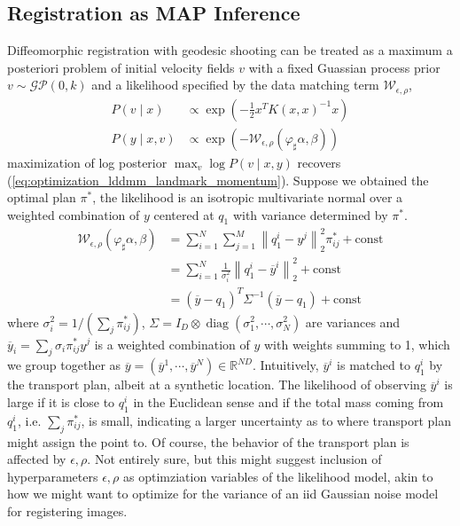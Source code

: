 \documentclass{6838publ}
\newcommand\sG{\ensuremath{\mathcal{G}}}
\newcommand\sP{\ensuremath{\mathcal{P}}}
\newcommand\sW{\ensuremath{\mathcal{W}}}
\newcommand\R{\ensuremath{\mathbb{R}}} %
\newcommand{\norm}[1]{\left\lVert#1\right\rVert}
\DeclareMathOperator*{\diag}{diag} %
\begin{document}
\subsection{Registration as MAP Inference}

Diffeomorphic registration with geodesic shooting can be treated as a maximum a posteriori problem of initial velocity fields $v$ with a fixed Guassian process prior $v \sim \sG\sP(0,k)$ and a likelihood specified by the data matching term $\sW_{\epsilon,\rho}$,
\begin{align}
    P(v\mid x)
        &\propto \exp(-\frac{1}{2} x^TK(x,x)^{-1}x) \\
    P(y\mid x, v)
        &\propto \exp(-\sW_{\epsilon,\rho}(\varphi_\sharp \alpha, \beta))
    \label{eq:registration_prior_and_likelihood}
\end{align}
maximization of log posterior $\max_v \log P(v\mid x,y)$ recovers (\ref{eq:optimization_lddmm_landmark_momentum}). Suppose we obtained the optimal plan $\pi^*$, the likelihood is an isotropic multivariate normal over a weighted combination of $y$ centered at $q_1$ with variance determined by $\pi^*$.
\begin{align}
    \sW_{\epsilon,\rho}(\varphi_\sharp\alpha,\beta)
        &= \sum_{i=1}^N \sum_{j=1}^M \norm{q_1^i - y^j}_2^2 \pi_{ij}^* + \text{const} \\
        &= \sum_{i=1}^N \frac{1}{\sigma^2_i} \norm{q_1^i - \overline{y}^i}_2^2 + \text{const} \\
        &= (\overline{y} - q_1)^T \Sigma^{-1} (\overline{y} - q_1) + \text{const}
\end{align}
where $\sigma_i^2 = 1/(\sum_{j}\pi_{ij}^*)$, $\Sigma = I_D \otimes \diag(\sigma_1^2,\cdots,\sigma_N^2)$ are variances and $\overline{y}_i = \sum_j \sigma_i \pi_{ij}^* y^j$ is a weighted combination of $y$ with weights summing to 1, which we group together as $\overline{y} = (\overline{y}^1,\cdots,\overline{y}^N) \in \R^{ND}$. Intuitively, $\overline{y}^i$ is matched to $q_1^i$ by the transport plan, albeit at a synthetic location. The likelihood of observing $\overline{y}^i$ is large if it is close to $q_1^i$ in the Euclidean sense and if the total mass coming from $q_1^i$, i.e. $\sum_{j}\pi_{ij}^*$, is small, indicating a larger uncertainty as to where transport plan might assign the point to. Of course, the behavior of the transport plan is affected by $\epsilon,\rho$. Not entirely sure, but this might suggest inclusion of hyperparameters $\epsilon,\rho$ as optimziation variables of the likelihood model, akin to how we might want to optimize for the variance of an iid Gaussian noise model for registering images.
\end{document}
